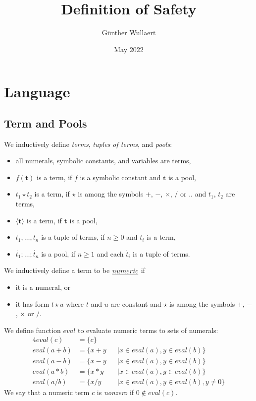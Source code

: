\documentclass{article}
\title{Definition of Safety}
\author{Günther Wullaert}
\date{May 2022}
\newcommand{\pool}[1]{\boldsymbol{#1}}
\newcommand{\tuple}[1]{\dot{#1}}
\begin{document}
	\maketitle

	\section{Language}
	\subsection{Term and Pools}

	We inductively define \emph{terms}, \emph{tuples of terms}, and \emph{pools}:
	\begin{itemize}
		\item all numerals, symbolic constants, and variables are terms,
		\item $f(\pool{t})$ is a term, if $f$ is a symbolic constant and $\pool{t}$ is a pool,
		\item $t_1 \star t_2$ is a term, if $\star$ is among the symbols $+$, $-$, $\times$, $/$ or $..$ and $t_1$, $t_2$ are terms,
		\item $\langle \pool{t} \rangle$ is a term, if $\pool{t}$ is a pool,
		\item $t_1,\dots,t_n$ is a tuple of terms, if $n \ge 0$ and $t_i$ is a term,
		\item $\tuple{t_1};\dots;\tuple{t_n}$ is a pool, if $n \ge 1$ and each $\tuple{t_i}$ is a tuple of terms.
	\end{itemize}

	We inductively define a term to be $\emph{numeric}$ if
	\begin{itemize}
		\item it is a numeral, or
		\item it has form $t \star u$ where $t$ and $u$ are constant and $\star$ is among the symbols $+$, $-$, $\times$ or $/$.
	\end{itemize}

	We define function $\mathit{eval}$ to evaluate numeric terms to sets of numerals:
	\begin{alignat*}{4}
		\mathit{eval}(c) &= \{c\} & \\
		\mathit{eval}(a + b) &= \{ x + y &&\mid x \in eval(a), y \in eval(b) \} \\
		\mathit{eval}(a - b) &= \{ x - y &&\mid x \in eval(a), y \in eval(b) \} \\
		\mathit{eval}(a * b) &= \{ x * y &&\mid x \in eval(a), y \in eval(b) \} \\
		\mathit{eval}(a / b) &= \{ x / y &&\mid x \in eval(a), y \in eval(b), y \neq 0 \}
	\end{alignat*}
	We say that a numeric term $c$ is \emph{nonzero} if $0 \notin \mathit{eval}(c)$.
\end{document}
